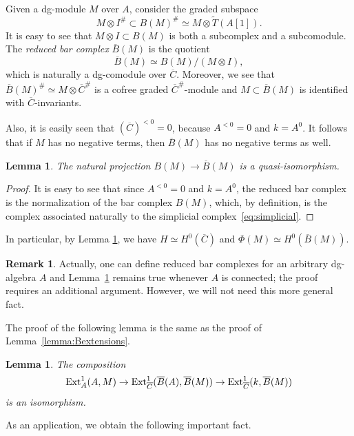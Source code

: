 \documentclass[10pt,russian]{article}
\theoremstyle{plain}
\newtheorem{lemma}[theorem]{Lemma}
\theoremstyle{definition}
\newtheorem{rem}[theorem]{Remark}
\newcommand{\Ext}{{\rm Ext}}
\begin{document}
Given a dg-module $M$ over $A$, consider the graded subspace
$$
M\otimes I^{\#}\subset B(M)^{\#}\simeq M\otimes \widetilde{T}(A[1]).
$$
It is easy to see that $M\otimes I\subset B(M)$ is both a subcomplex and a subcomodule. The \emph{reduced bar complex} $\overline{B}(M)$ is the quotient
$$
\overline{B}(M)\simeq B(M)/(M\otimes I),
$$
which is naturally a dg-comodule over $\overline{C}$. Moreover, we see that $\overline{B}(M)^{\#}\simeq M\otimes\overline{C}^{\#}$ is a cofree graded $\overline{C}^{\#}$-module and $M\subset \overline{B}(M)$ is identified with $\overline{C}$-invariants.

Also, it is easily seen that $(\overline{C})^{<0}=0$, because $A^{<0}=0$ and $k=A^0$. It follows that if $M$ has no negative terms, then $\overline{B}(M)$ has no negative terms as well.


\begin{lemma}\label{lem:reducedquis}
The	natural projection $B(M)\to\overline{B}(M)$ is a quasi-isomorphism.
\end{lemma}	
\begin{proof}
It is easy to see that since $A^{ <0} =0$ and $k=A^0$, the reduced bar complex is the normalization of the bar complex $B(M)$, which, by definition, is the complex associated naturally to the simplicial complex~\eqref{eq:simplicial}.
\end{proof}

In particular, by Lemma \ref{lem:reducedquis}, we have $H\simeq H^0(\overline{C})$ and $\Phi(M) \simeq H^0(\overline{B}(M))$.

\begin{rem}
Actually, one can define reduced bar complexes for an arbitrary dg-algebra $A$ and Lemma~\ref{lem:reducedquis} remains true whenever $A$ is connected; the proof requires an additional argument. However, we will not need this more general fact.
\end{rem}

The proof of the following lemma is the same as the proof of Lemma~\ref{lemma:Bextensions}.

\begin{lemma}\label{lemma:barBextensions}
The composition
$$
\Ext^1_A(A,M)\to \Ext^1_{\overline{C}}(\overline{B}(A),\overline{B}(M))\to \Ext^1_{\overline{C}}(k,\overline{B}(M))
$$
is an isomorphism.
\end{lemma}

As an application, we obtain the following important fact.
\end{document}
